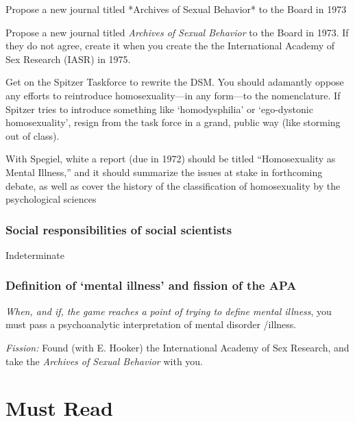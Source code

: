 \begin{refsection}
\begin{proposal}[Green]\label{proposal:greenB} Propose a new journal titled *Archives of Sexual Behavior* to the Board in 1973\end{proposal}

Propose a new journal titled \emph{Archives of Sexual Behavior} to the Board in 1973. If they do not agree, create it when you create the the International Academy of Sex Research (IASR) in 1975.

Get on the Spitzer Taskforce to rewrite the DSM. You should adamantly oppose any efforts to reintroduce homosexuality—in any form—to the nomenclature. If Spitzer tries to introduce something like `homodysphilia' or `ego-dystonic homosexuality', resign from the task force in a grand, public way (like storming out of class).

\begin{writingtask}[Green]\label{writingtask:green}
With Spegiel, white a report (due in 1972) should be titled “Homosexuality as Mental Illness,” and it should summarize the issues at stake in forthcoming debate, as well as cover the history of the classification of homosexuality by the psychological sciences
\end{writingtask}

\subsubsection{Social responsibilities of social scientists}
\label{socialresponsibilitiesofsocialscientists}

Indeterminate

\subsubsection{Definition of ‘mental illness’ and fission of the APA}
\label{definitionof‘mentalillness’andfissionoftheapa}

\emph{When, and if, the game reaches a point of trying to define mental illness}, you must pass a psychoanalytic interpretation of mental disorder \slash  illness.

\emph{Fission:} Found (with E. Hooker) the International Academy of Sex Research, and take the \emph{Archives of Sexual Behavior} with you.

\section{Must Read}
\label{mustread}


\end{refsection}
